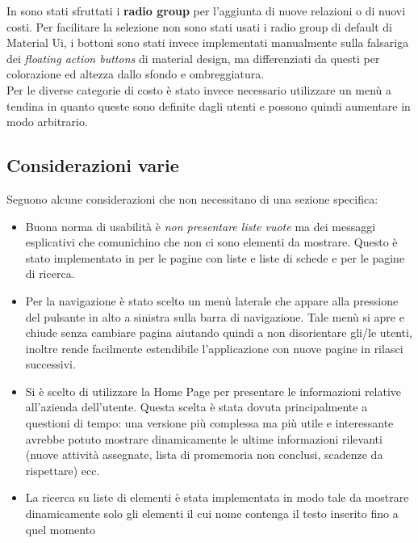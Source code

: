 In \fiscoloMobile{} sono stati sfruttati i \textbf{radio group} per l'aggiunta di nuove
relazioni o di nuovi costi. Per facilitare la selezione non sono stati usati i radio group
di default di Material Ui, i bottoni sono stati invece implementati manualmente sulla falsariga
dei \textit{floating action buttons} di material design, ma differenziati da questi per
colorazione ed altezza dallo sfondo e ombreggiatura.  \\

Per le diverse categorie di costo è stato invece necessario utilizzare un menù a tendina
in quanto queste sono definite dagli utenti e possono quindi aumentare in modo arbitrario.

\subsection{Considerazioni varie}

Seguono alcune considerazioni che non necessitano di una sezione specifica:

\begin{itemize}
\item Buona norma di usabilità è \textit{non presentare liste vuote} ma dei messaggi esplicativi
che comunichino che non ci sono elementi da mostrare. Questo è stato implementato in
\fiscoloMobile{} per le pagine con liste e liste di schede e per le pagine di ricerca.
\item Per la navigazione è stato scelto un menù laterale che appare alla pressione
del pulsante in alto a sinistra sulla barra di navigazione. Tale menù si apre e chiude senza
cambiare pagina aiutando quindi a non disorientare gli/le utenti, inoltre rende facilmente
estendibile l'applicazione con nuove pagine in rilasci successivi.
\item Si è scelto di utilizzare la Home Page per presentare le informazioni relative all'azienda
dell'utente. Questa scelta è stata dovuta principalmente a questioni di tempo: una versione
più complessa ma più utile e interessante avrebbe potuto mostrare dinamicamente le ultime
informazioni rilevanti (nuove attività assegnate, lista di promemoria non conclusi, scadenze
da rispettare) ecc.
\item La ricerca su liste di elementi è stata implementata in modo tale da mostrare dinamicamente
solo gli elementi il cui nome contenga il testo inserito fino a quel momento
\end{itemize}
